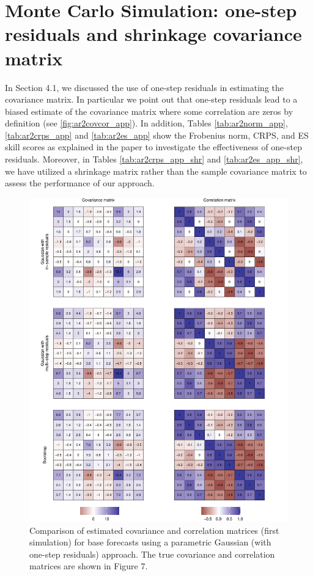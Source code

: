 \documentclass[a4paper,11pt]{article}
\theoremstyle{definition}
\begin{document}
\newpage
\section{Monte Carlo Simulation: one-step residuals and shrinkage covariance matrix}

In Section 4.1, we discussed the use of one-step residuals in estimating the covariance matrix. In particular we point out that one-step residuals lead to a biased estimate of the covariance matrix where some correlation are zeros by definition (see \autoref{fig:ar2covcor_app}). 
In addition, Tables \ref{tab:ar2norm_app}, \ref{tab:ar2crps_app} and \ref{tab:ar2es_app} show the Frobenius norm, CRPS, and ES skill scores as explained in the paper to investigate the effectiveness of one-step residuals. 
Moreover, in Tables \ref{tab:ar2crps_app_shr} and \ref{tab:ar2es_app_shr}, we have utilized a shrinkage matrix rather than the sample covariance matrix to assess the performance of our approach.

\begin{figure}[p]
	\centering
	\includegraphics[width = \linewidth]{fig/AR/base_cov_app.pdf}
	\caption{Comparison of estimated covariance and correlation matrices (first simulation) for base forecasts using a parametric Gaussian (with one-step residuals) approach. The true covariance and correlation matrices are shown in Figure 7.}
	\label{fig:ar2covcor_app}
\end{figure}
\end{document}
